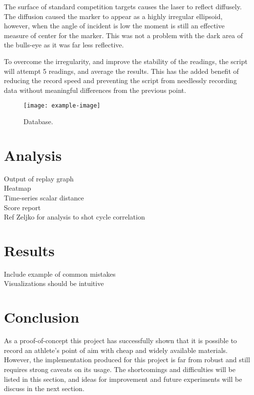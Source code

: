 \documentclass[conference]{IEEEtran}
\begin{document}
The surface of standard competition targets causes the laser to reflect diffusely.
The diffusion caused the marker to appear as a highly irregular ellipsoid,
however, when the angle of incident is low the moment is still an effective measure of center for the marker.
This was not a problem with the dark area of the bulls-eye as it was far less reflective.

To overcome the irregularity, and improve the stability of the readings, the script will attempt 5 readings, and average the results.
This has the added benefit of reducing the record speed and preventing the script from needlessly recording data without meaningful differences from the previous point.


\begin{figure}[h]
	\centering
	\texttt{[image: example-image]}
	\caption{Database.}
	\label{fig:database}
\end{figure}

\section{Analysis}

\noindent
\textlangle Output of replay graph \textrangle \\
\textlangle Heatmap \textrangle \\
\textlangle Time-series scalar distance \textrangle \\
\textlangle Score report \textrangle \\
\textlangle Ref Zeljko for analysis to shot cycle correlation \textrangle

\section{Results}

\noindent
\textlangle Include example of common mistakes \textrangle \\
\textlangle Visualizations should be intuitive \textrangle

\section{Conclusion}

As a proof-of-concept this project has successfully shown that it is possible to record an athlete's point of aim with cheap and widely available materials.
However, the implementation produced for this project is far from robust and still requires strong caveats on its usage.
The shortcomings and difficulties will be listed in this section, 
and ideas for improvement and future experiments will be discuss in the next section.
\end{document}
